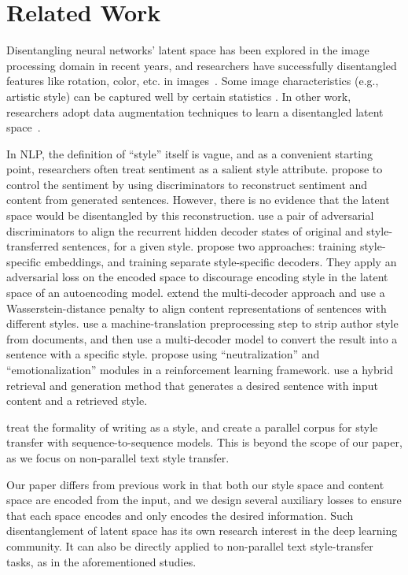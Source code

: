 \documentclass[11pt,a4paper]{article}
\begin{document}
\section{Related Work}

Disentangling neural networks' latent space has been explored in the image processing domain in recent years, and researchers have successfully disentangled features like rotation, color, etc. in images~\cite{chen2016infogan,luan2017deep}.
Some image characteristics (e.g., artistic style) can be captured well by certain statistics \cite{gatys2016image}.
In other work, researchers adopt data augmentation techniques to learn a disentangled latent space~\cite{kulkarni2015deep,champandard2016semantic}.

In NLP, the definition of ``style'' itself is vague, and as a convenient starting point, researchers often treat sentiment as a salient style attribute.
\citet{hu2017toward} propose to control the sentiment by using discriminators to reconstruct sentiment and content from generated sentences.
However, there is no evidence that the latent space would be disentangled by this reconstruction.
\citet{shen2017style} use a pair of adversarial discriminators to align the recurrent hidden decoder states of original and style-transferred sentences, for a given style.
\citet{fu2018style} propose two approaches: training style-specific embeddings, and training separate style-specific decoders. They apply an adversarial loss on the encoded space to discourage encoding style in the latent space of an autoencoding model. 
\citet{zhao2018adversarially} extend the multi-decoder approach and use a Wasserstein-distance penalty to align content representations of sentences with different styles.
\citet{prabhumoye2018style} use a machine-translation preprocessing step to strip author style from documents, and then use a multi-decoder model to convert the result into a sentence with a specific style.
\citet{xu2018unpaired} propose using ``neutralization'' and ``emotionalization'' modules in a reinforcement learning framework.
\citet{li2018delete} use a hybrid retrieval and generation method that generates a desired sentence with input content and a retrieved style.

\citet{rao2018dear} treat the formality of writing as a style, and create a parallel corpus for style transfer with sequence-to-sequence models. 
This is beyond the scope of our paper, as we focus on non-parallel text style transfer.

Our paper differs from previous work in that both our style space and content space are encoded from the input, and we design several auxiliary losses to ensure that each space encodes and only encodes the desired information.
Such disentanglement of latent space has its own research interest in the deep learning community.
It can also be directly applied to non-parallel text style-transfer tasks, as in the aforementioned studies.
\end{document}
